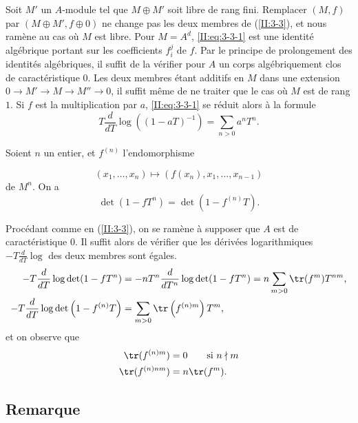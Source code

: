 Soit $M'$ un $A$-module tel que $M\oplus M'$ soit libre de rang fini. 
Remplacer $(M,f)$ par $(M\oplus M',f\oplus 0)$ ne change pas les deux membres 
de (\ref{II:3-3}), et nous ramène au cas où $M$ est libre. Pour $M=A^d$, 
\eqref{II:eq:3-3-1} est une identité algébrique portant sur les coefficients 
$f_i^j$ de $f$. Par le principe de prolongement des identités algébriques, 
il suffit de la vérifier pour $A$ un corps algébriquement clos de 
caractéristique $0$. Les deux membres étant additifs en $M$ dans une 
extension $0\to M'\to M\to M''\to 0$, il suffit même de ne traiter que le cas 
où $M$ est de rang $1$. Si $f$ est la multiplication par $a$, 
\eqref{II:eq:3-3-1} se réduit alors à la formule 
\[
  T\frac{d}{dT}\log\left((1-a T)^{-1}\right) = \sum_{n>0} a^n T^n \text{.}
\]





\begin{corollary_}\label{II:3-4}
Soient $n$ un entier, et $f^{(n)}$ l'endomorphisme 

\[(x_1,\dotsc,x_n)\mapsto \left(f(x_n),x_1,\dotsc,x_{n-1}\right)\]
 de $M^n$. 
On a 
\begin{equation*}\tag{3.4.1}\label{II:eq:3-4-1}
  \det(1-f T^n) = \det(1-f^{(n)} T) \text{.}
\end{equation*}
\end{corollary_}

Procédant comme en (\ref{II:3-3}), on se ramène à supposer que $A$ est de 
caractéristique $0$. Il suffit alors de vérifier que les dérivées 
logarithmiques $-T\frac{d}{dT}\log$ des deux membres sont égales. 
\begin{align*}
  -T\frac{d}{dT}\log\det(1-f T^n) &= - n T^n \frac{d}{dT^n} \log\det(1-f T^n) = n \sum_{m>0} \tr(f^m) T^{n m} \text{,} \\
  -T \frac{d}{dT}\log\det\left(1-f^{(n)} T\right) &= \sum_{m>0} \tr\left(f^{(n) m}\right) T^m \text{,}
\end{align*}
et on observe que 
\begin{align*}
  \tr(f^{(n) m}) &= 0 \qquad \text{si $n\nmid m$} \\
  \tr(f^{(n) n m}) &= n \tr(f^m) \text{.}
\end{align*}





\subsection{Remarque}\label{II:3-5}

